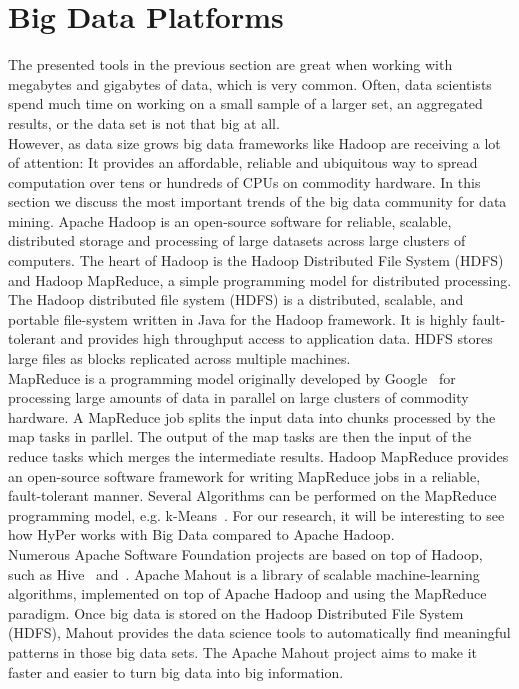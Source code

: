 \section{Big Data Platforms}
The presented tools in the previous section are great when working with megabytes and gigabytes of data, which is very common. Often, data scientists spend much time on working on a small sample of a larger set, an aggregated results, or the data set is not that big at all.
\\
However, as data size grows big data frameworks like Hadoop are receiving a lot of attention: It provides an affordable, reliable and ubiquitous way to spread computation over tens or hundreds of CPUs on commodity hardware. In this section we discuss the most important trends of the big data community for data mining. Apache Hadoop is an open-source software for reliable, scalable, distributed storage and processing of large datasets across large clusters of computers. The heart of Hadoop is the Hadoop Distributed File System (HDFS) and Hadoop MapReduce, a simple programming model for distributed processing. 
\\
The Hadoop distributed file system (HDFS) is a distributed, scalable, and portable file-system written in Java for the Hadoop framework. It is highly fault-tolerant and provides high throughput access to application data. HDFS stores large files as blocks replicated across multiple machines.
\\
MapReduce is a programming model originally developed by Google~\parencite{mapreduce} for processing large amounts of data in parallel on large clusters of commodity hardware. A MapReduce job splits the input data into chunks processed by the map tasks in parllel. The output of the map tasks are then the input of the reduce tasks which merges the intermediate results. Hadoop MapReduce provides an open-source software framework for writing MapReduce jobs in a reliable, fault-tolerant manner. 
Several Algorithms can be performed on the MapReduce programming model, e.g. k-Means~\parencite{parallelkmeans}. For our research, it will be interesting to see how HyPer works with Big Data compared to Apache Hadoop.
\\
Numerous Apache Software Foundation projects are based on top of Hadoop, such as Hive~\parencite{hive} and~\parencite{cassandra}. Apache Mahout is a library of scalable machine-learning algorithms, implemented on top of Apache Hadoop and using the MapReduce paradigm. 
Once big data is stored on the Hadoop Distributed File System (HDFS), Mahout provides the data science tools to automatically find meaningful patterns in those big data sets. The Apache Mahout project aims to make it faster and easier to turn big data into big information.
